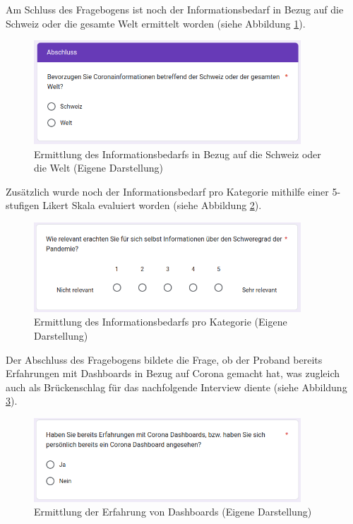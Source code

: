 \clearpage
Am Schluss des Fragebogens ist noch der Informationsbedarf in Bezug auf die Schweiz oder die gesamte Welt ermittelt worden (siehe Abbildung \ref{fig:online_formular_worldwide_switzerland_information_need}).

\begin{figure}[h]
    \includegraphics[width=10cm]{images/online_formular_worldwide_switzerland_information_need.png}
    \centering
    \caption{Ermittlung des Informationsbedarfs in Bezug auf die Schweiz oder die Welt (Eigene Darstellung)}
    \label{fig:online_formular_worldwide_switzerland_information_need}
\end{figure}

Zusätzlich wurde noch der Informationsbedarf pro Kategorie mithilfe einer 5-stufigen Likert Skala evaluiert worden (siehe Abbildung \ref{fig:online_formular_likert_scale_category}).

\begin{figure}[h]
    \includegraphics[width=10cm]{images/online_formular_likert_scale_category.png}
    \centering
    \caption{Ermittlung des Informationsbedarfs pro Kategorie (Eigene Darstellung)}
    \label{fig:online_formular_likert_scale_category}
\end{figure}

Der Abschluss des Fragebogens bildete die Frage, ob der Proband bereits Erfahrungen mit Dashboards in Bezug auf Corona gemacht hat, was zugleich auch als Brückenschlag für das nachfolgende Interview diente (siehe Abbildung \ref{fig:online_formular_experience_with_dashboards}).

\begin{figure}[h]
    \includegraphics[width=10cm]{images/online_formular_experience_with_dashboards.png}
    \centering
    \caption{Ermittlung der Erfahrung von Dashboards (Eigene Darstellung)}
    \label{fig:online_formular_experience_with_dashboards}
\end{figure}

